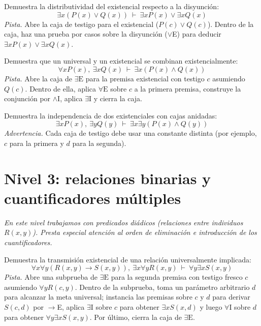 \begin{pregunta}\label{e4-8}
Demuestra la distributividad del existencial respecto a la disyunción:
\[
\exists x (P(x) \lor Q(x)) \ \vdash \ \exists x P(x) \lor \exists x Q(x)
\]
\textit{Pista.} Abre la caja de testigo para el existencial ($P(c) \lor Q(c)$). Dentro de la caja, haz una prueba por casos sobre la disyunción ($\lor$E) para deducir $\exists x P(x) \lor \exists x Q(x)$.
\end{pregunta}

\begin{pregunta}\label{e4-9}
Demuestra que un universal y un existencial se combinan existencialmente:
\[
\forall x P(x), \ \exists x Q(x) \ \vdash \ \exists x (P(x) \land Q(x))
\]
\textit{Pista.} Abre la caja de $\exists\text{E}$ para la premisa existencial con testigo $c$ asumiendo $Q(c)$. Dentro de ella, aplica $\forall\text{E}$ sobre $c$ a la primera premisa, construye la conjunción por $\land\text{I}$, aplica $\exists\text{I}$ y cierra la caja.
\end{pregunta}

\begin{pregunta}\label{e4-10}
Demuestra la independencia de dos existenciales con cajas anidadas:
\[
\exists x P(x), \ \exists y Q(y) \ \vdash \ \exists x \exists y (P(x) \land Q(y))
\]
\textit{Advertencia.} Cada caja de testigo debe usar una constante distinta (por ejemplo, $c$ para la primera y $d$ para la segunda).
\end{pregunta}

\section*{Nivel 3: relaciones binarias y cuantificadores múltiples}
\textit{En este nivel trabajamos con predicados diádicos (relaciones entre individuos $R(x, y)$). Presta especial atención al orden de eliminación e introducción de los cuantificadores.}

\begin{pregunta}\label{e4-11}
Demuestra la transmisión existencial de una relación universalmente implicada:
\[
\forall x \forall y (R(x, y) \to S(x, y)), \ \exists x \forall y R(x, y) \ \vdash \ \forall y \exists x S(x, y)
\]
\textit{Pista.} Abre una subprueba de $\exists\text{E}$ para la segunda premisa con testigo fresco $c$ asumiendo $\forall y R(c, y)$. Dentro de la subprueba, toma un parámetro arbitrario $d$ para alcanzar la meta universal; instancia las premisas sobre $c$ y $d$ para derivar $S(c, d)$ por $\to$E, aplica $\exists\text{I}$ sobre $c$ para obtener $\exists x S(x, d)$ y luego $\forall\text{I}$ sobre $d$ para obtener $\forall y \exists x S(x, y)$. Por último, cierra la caja de $\exists\text{E}$.
\end{pregunta}

